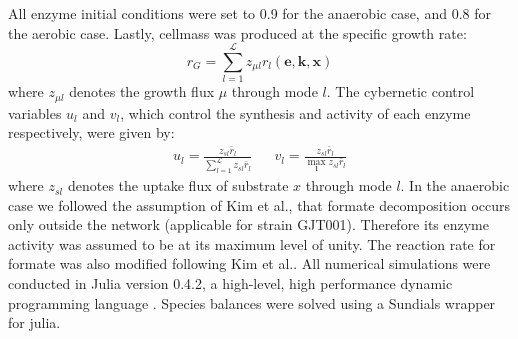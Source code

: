 \documentclass[10pt,twocolumn,twoside,final]{IEEEtran}
\begin{document}
All enzyme initial conditions were set to 0.9 for the anaerobic case, and 0.8 for the aerobic case.
Lastly, cellmass was produced at the specific growth rate:
\begin{equation}
	r_{G}  = \sum_{l = 1}^{\mathcal{L}}z_{\mu l}r_{l}\left(\mathbf{e},\mathbf{k},\mathbf{x}\right)
\end{equation}
where $z_{\mu l}$ denotes the growth flux $\mu$ through mode $l$.
The cybernetic control variables $u_{l}$ and $v_{l}$, which control the synthesis and activity of each enzyme respectively, were given by:
\begin{align*}
	u_{l}  = \frac{z_{sl}\bar{r}_{l}}{\sum\limits_{l = 1}^{\mathcal{L}}z_{sl}\bar{r}_{l}} && v_{l} = \frac{z_{sl}\bar{r}_{l}}{\max\limits_{\mathbf{l}} z_{sl}\bar{r}_{l}}
\end{align*}
where $z_{sl}$ denotes the uptake flux of substrate $x$ through mode $l$.
In the anaerobic case we followed the assumption of Kim et al.\cite{2008_kim_varner_ramkrishna_BiotechProg},
that formate decomposition occurs only outside the network (applicable for strain GJT001).
Therefore its enzyme activity was assumed to be at its maximum level of unity.
The reaction rate for formate was also modified following Kim et al.\cite{2008_kim_varner_ramkrishna_BiotechProg}. All numerical simulations were conducted in Julia version 0.4.2, a high-level, high performance dynamic programming language \cite{Julia}. Species balances were solved using a Sundials \cite{Sundials} wrapper for julia.
\end{document}
